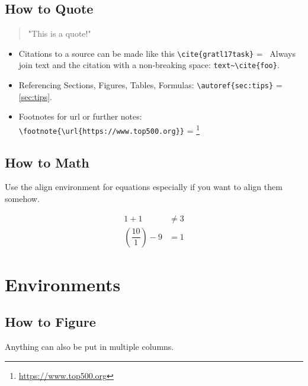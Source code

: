 \documentclass[
			   fontsize=11pt,
               paper=a4,
               bibliography=totoc,
               idxtotoc,
               headsepline,
               footsepline,
               footinclude=false,
               BCOR=12mm,
               DIV=13,
               openany,   %
               ]
               {scrbook}
\begin{document}
\subsection{How to Quote}

\begin{quote}
	"This is a quote!"
\end{quote}

\begin{itemize}
	\item Citations to a source can be made like this \verb|\cite{gratl17task}| =~\cite{gratl17task}
	\subitem Always join text and the citation with a non-breaking space: \verb|text~\cite{foo}|.
	\item Referencing Sections, Figures, Tables, Formulas: \verb|\autoref{sec:tips}| = \autoref{sec:tips}.
	\item Footnotes for url or further notes: \verb|\footnote{\url{https://www.top500.org}}| = \footnote{\url{https://www.top500.org}}
\end{itemize}

\subsection{How to Math}

Use the align environment for equations especially if you want to align them somehow.

\begin{align}
	1 + 1 &\ne 3\\
	\left(\dfrac{10}{1}\right) - 9 &= 1
\end{align}

\clearpage

\section{Environments}

\subsection{How to Figure}

Anything can also be put in multiple columns.
\end{document}
